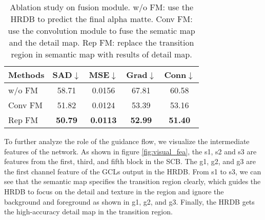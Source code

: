 \documentclass[10pt,twocolumn,letterpaper]{article}
\begin{document}
\begin{table}
  \centering
  \begin{tabular}{@{}lcccc@{}}
    \toprule
    Methods & SAD$\downarrow$ & MSE$\downarrow$ & Grad$\downarrow$ & Conn$\downarrow$ \\
    \midrule
    w/o FM & 58.71	& 0.0156 & 67.81 & 60.58 \\
    Conv FM & 51.82 & 0.0124 & 53.39 & 53.16 \\
    Rep FM &\bf{50.79} & \bf{0.0113} & \bf{52.99} & \bf{51.40} \\
    \bottomrule
  \end{tabular}
  \caption{Ablation study on fusion module. w/o FM: use the HRDB to predict the final alpha matte. Conv FM: use the convolution module to fuse the sematic map and the detail map. Rep FM: replace the transition region in semantic map with results of detail map.}
  \label{tab:fusion-ablation}
\end{table}



To further analyze the role of the guidance flow, we visualize the intermediate features of the network. As shown in figure \ref{fig:visual_fea}, the s1, s2 and s3 are features from the first, third, and fifth block in the SCB. The g1, g2, and g3 are the first channel feature of the GCLs output in the HRDB. From s1 to s3, we can see that the semantic map specifies the transition region clearly, which guides the HRDB to focus on the detail and texture in the region and ignore the background and foreground as shown in g1, g2, and g3. Finally, the HRDB gets the high-accuracy detail map in the transition region.
\end{document}
